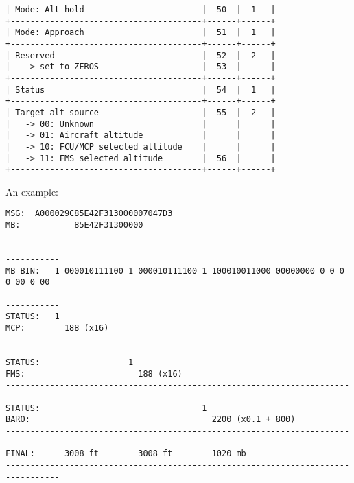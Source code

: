 \begin{verbatim}
| Mode: Alt hold                        |  50  |  1   |
+---------------------------------------+------+------+
| Mode: Approach                        |  51  |  1   |
+---------------------------------------+------+------+
| Reserved                              |  52  |  2   |
|   -> set to ZEROS                     |  53  |      |
+---------------------------------------+------+------+
| Status                                |  54  |  1   |
+---------------------------------------+------+------+
| Target alt source                     |  55  |  2   |
|   -> 00: Unknown                      |      |      |
|   -> 01: Aircraft altitude            |      |      |
|   -> 10: FCU/MCP selected altitude    |      |      |
|   -> 11: FMS selected altitude        |  56  |      |
+---------------------------------------+------+------+
\end{verbatim}

An example:

\begin{verbatim}
MSG:  A000029C85E42F313000007047D3
MB:           85E42F31300000

---------------------------------------------------------------------------------
MB BIN:   1 000010111100 1 000010111100 1 100010011000 00000000 0 0 0 0 00 0 00
---------------------------------------------------------------------------------
STATUS:   1
MCP:        188 (x16)
---------------------------------------------------------------------------------
STATUS:                  1
FMS:                       188 (x16)
---------------------------------------------------------------------------------
STATUS:                                 1
BARO:                                     2200 (x0.1 + 800)
---------------------------------------------------------------------------------
FINAL:      3008 ft        3008 ft        1020 mb
---------------------------------------------------------------------------------
\end{verbatim}

